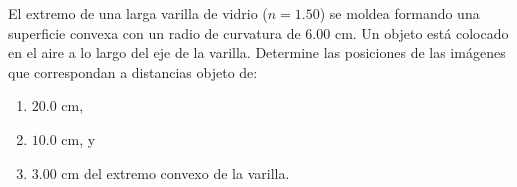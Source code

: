 \item El extremo de una larga varilla de vidrio ($n = 1.50$) se moldea formando una superficie convexa con un radio de curvatura de $6.00\text{ cm}$. Un objeto está colocado en el aire a lo largo del eje de la varilla. Determine las posiciones de las imágenes que correspondan a distancias objeto de:
\begin{enumerate}
    \item $20.0\text{ cm}$,
    \item $10.0\text{ cm}$, y
    \item $3.00\text{ cm}$ del extremo convexo de la varilla.
\end{enumerate}